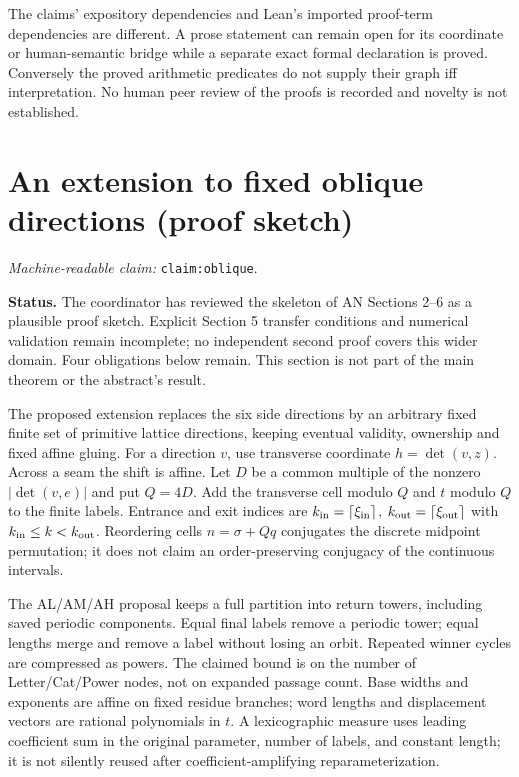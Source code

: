 \documentclass[11pt]{amsart}
\newcommand{\record}[1]{\nolinkurl{#1}}
\newcommand{\claimid}[1]{\par\nopagebreak\noindent\textit{Machine-readable claim:} \record{#1}.\par}
\theoremstyle{definition}\newtheorem{definition}{Definition}
\begin{document}
The claims' expository dependencies and Lean's imported proof-term
dependencies are different. A prose statement can remain open for
its coordinate or human-semantic bridge while a separate exact
formal declaration is proved. Conversely the proved arithmetic
predicates do not supply their graph iff interpretation. No human
peer review of the proofs is recorded and novelty is not established.

\section{An extension to fixed oblique directions (proof sketch)}\label{sec:extension}
\label{claim:oblique}\claimid{claim:oblique}
\textbf{Status.} The coordinator has reviewed the skeleton of AN
Sections 2--6 as a plausible proof sketch. Explicit Section 5 transfer
conditions and numerical validation remain incomplete; no independent
second proof covers this wider domain. Four obligations below remain.
This section is not part of the main theorem or the abstract's result.

The proposed extension replaces the six side directions by an arbitrary
fixed finite set of primitive lattice directions, keeping eventual
validity, ownership and fixed affine gluing. For a direction $v$, use
transverse coordinate $h=\det(v,z)$. Across a seam the shift is affine.
Let $D$ be a common multiple of the nonzero $|\det(v,e)|$ and put
$Q=4D$. Add the transverse cell modulo $Q$ and $t$ modulo $Q$ to the
finite labels. Entrance and exit indices are
$k_{\rm in}=\lceil\xi_{\rm in}\rceil$,
$k_{\rm out}=\lceil\xi_{\rm out}\rceil$ with
$k_{\rm in}\le k<k_{\rm out}$. Reordering cells $n=\sigma+Qq$
conjugates the discrete midpoint permutation; it does not claim an
order-preserving conjugacy of the continuous intervals.

The AL/AM/AH proposal keeps a full partition into return towers,
including saved periodic components. Equal final labels remove a
periodic tower; equal lengths merge and remove a label without losing
an orbit. Repeated winner cycles are compressed as powers. The claimed
bound is on the number of Letter/Cat/Power nodes, not on expanded
passage count. Base widths and exponents are affine on fixed residue
branches; word lengths and displacement vectors are rational
polynomials in $t$. A lexicographic measure uses leading coefficient
sum in the original parameter, number of labels, and constant length;
it is not silently reused after coefficient-amplifying reparameterization.
\end{document}
